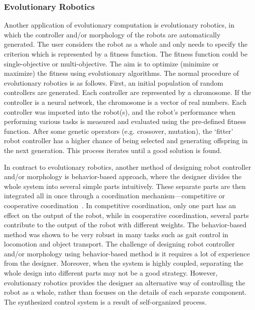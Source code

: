 \begin{itemize}
\end{itemize}

\subsubsection{Evolutionary Robotics}\label{sec:evolutionary_robotics}

Another application of evolutionary computation is evolutionary robotics, in which the controller and/or morphology of the robots are automatically generated. The user considers the robot as a whole and only needs to specify the criterion which is represented by a fitness function. The fitness function could be single-objective or multi-objective. The aim is to optimize (minimize or maximize) the fitness using evolutionary algorithms. The normal procedure of evolutionary robotics is as follows. First, an initial population of random controllers are generated. Each controller are represented by a chromosome. If the controller is a neural network, the chromosome is a vector of real numbers. Each controller was imported into the robot(s), and the robot's performance when performing various tasks is measured and evaluated using the pre-defined fitness function. After some genetic operators (e.g. crossover, mutation), the `fitter' robot controller has a higher chance of being selected and generating offspring in the next generation. This process iterates until a good solution is found. 

In contract to evolutionary robotics, another method of designing robot controller and/or morphology is behavior-based approach, where the designer divides the whole system into several simple parts intuitively. These separate parts are then integrated all in once through a coordination mechanism---competitive or cooperative coordination~\cite{Brooks1986}. In competitive coordination, only one part has an effect on the output of the robot, while in cooperative coordination, several parts contribute to the output of the robot with different weights. The behavior-based method was shown to be very robust in many tasks such as gait control in locomotion and object transport. The challenge of designing robot controller and/or morphology using behavior-based method is it requires a lot of experience from the designer. Moreover, when the system is highly coupled, separating the whole design into different parts may not be a good strategy. However, evolutionary robotics provides the designer an alternative way of controlling the robot as a whole, rather than focuses on the details of each separate component. The synthesized control system is a result of self-organized process. %

